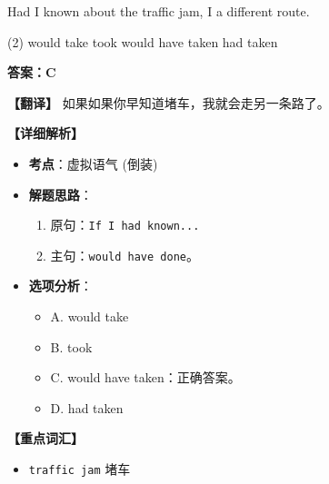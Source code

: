\documentclass[11pt, a4paper]{article}
\newcommand{\analysis}[4]{
    \begin{solutionbox}
        \textbf{答案：#1}
        
        \textbf{【翻译】} #2
        
        \textbf{【详细解析】}
        #3
        
        \textbf{【重点词汇】}
        #4
    \end{solutionbox}
}
\newcommand{\blank}{\underline{\hspace{1.5cm}}}
\begin{document}
\begin{questions}
    \item Had I known about the traffic jam, I \blank a different route.
    \begin{tasks}(2)
        \task would take \task took
        \task would have taken \task had taken
    \end{tasks}
    \analysis{C}{如果如果你早知道堵车，我就会走另一条路了。}{
        \begin{itemize}
            \item \textbf{考点}：虚拟语气 (倒装)
            \item \textbf{解题思路}：
                \begin{enumerate}
                    \item 原句：\texttt{If I had known...}
                    \item 主句：\texttt{would have done}。
                \end{enumerate}
            \item \textbf{选项分析}：
                \begin{itemize}
                    \item A. would take
                    \item B. took
                    \item C. would have taken：正确答案。
                    \item D. had taken
                \end{itemize}
        \end{itemize}
    }{
        \begin{itemize}
            \item \texttt{traffic jam} 堵车
        \end{itemize}
    }


\end{questions}
\end{document}
